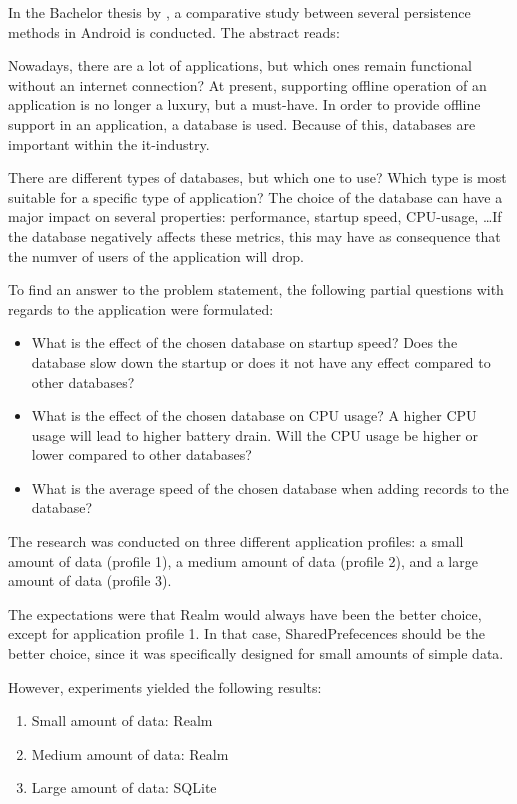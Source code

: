 In the Bachelor thesis by \textcite{Akin2016}, a comparative study between several persistence methods in Android is conducted. The abstract reads:

\begin{displayquote}
  Nowadays, there are a lot of applications, but which ones remain functional without an internet connection? At present, supporting offline operation of an application is no longer a luxury, but a must-have. In order to provide offline support in an application, a database is used. Because of this, databases are important within the it-industry.
  
  There are different types of databases, but which one to use? Which type is most suitable for a specific type of application? The choice of the database can have a major impact on several properties: performance, startup speed, CPU-usage, \ldots If the database negatively affects these metrics, this may have as consequence that the numver of users of the application will drop.
  
  To find an answer to the problem statement, the following partial questions with regards to the application were formulated:
  
  \begin{itemize}
    \item What is the effect of the chosen database on startup speed? Does the database slow down the startup or does it not have any effect compared to other databases?
    \item What is the effect of the chosen database on CPU usage? A higher CPU usage will lead to higher battery drain. Will the CPU usage be higher or lower compared to other databases?
    \item What is the average speed of the chosen database when adding records to the database?
  \end{itemize}
  
  The research was conducted on three different application profiles: a small amount of data (profile 1), a medium amount of data (profile 2), and a large amount of data (profile 3).
  
  The expectations were that Realm would always have been the better choice, except for application profile 1. In that case, SharedPrefecences should be the better choice, since it was specifically designed for small amounts of simple data.
  
  However, experiments yielded the following results:
  
  \begin{enumerate}
    \item Small amount of data: Realm
    \item Medium amount of data: Realm
    \item Large amount of data: SQLite
  \end{enumerate}

\end{displayquote}

